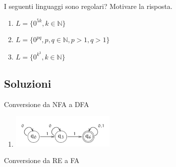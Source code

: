 \documentclass[a4paper,11pt]{article}
\begin{document}
    I seguenti linguaggi sono regolari? Motivare la risposta. 
    \begin{enumerate}
    \item $L=\{0^{5k}, k\in \mathbb{N} \}$
    \item $L=\{0^{pq},p,q\in \mathbb{N}, p>1,q>1 \}$
    \item $L=\{0^{k^3},k\in\mathbb{N} \}$
    \end{enumerate}
    \subsection{Soluzioni}
    Conversione da NFA a DFA
    \begin{enumerate}
        \item \begin{minipage}{\linewidth}
            \centering
            \includegraphics[width=5cm]{Lez3nfatodfa1.png}
        \end{minipage}
    \end{enumerate}
    Conversione da RE a FA
\end{document}
